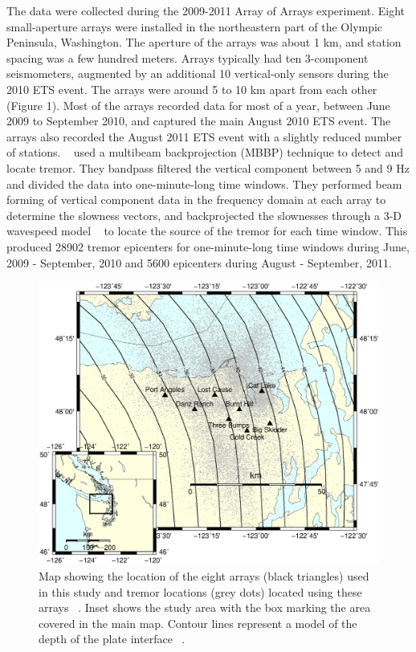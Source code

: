 \documentclass[draft]{agujournal2019}
\begin{document}
The data were collected during the 2009-2011 Array of Arrays experiment. Eight small-aperture arrays were installed in the northeastern part of the Olympic Peninsula, Washington. The aperture of the arrays was about 1 km, and station spacing was a few hundred meters. Arrays typically had ten 3-component seismometers, augmented by an additional 10 vertical-only sensors during the 2010 ETS event.  The arrays were around 5 to 10 km apart from each other (Figure 1). Most of the arrays recorded data  for most of  a year, between June 2009 to September 2010, and captured the main August 2010 ETS event. The arrays also recorded the August 2011 ETS event with a slightly reduced number of stations. ~ used a multibeam backprojection (MBBP) technique to detect and locate tremor. They bandpass filtered the vertical component between 5 and 9 Hz and divided the data into one-minute-long time windows. They performed beam forming of vertical component data in the frequency domain at each array to determine the slowness vectors, and backprojected the slownesses through a 3-D wavespeed model ~\cite{PRE_2003} to locate the source of the tremor for each time window. This produced 28902 tremor epicenters for one-minute-long time windows during June, 2009 - September, 2010 and 5600 epicenters during August - September, 2011.

\begin{figure}
\noindent\includegraphics[width=\textwidth, trim={0cm 2.5cm 0cm 9.5cm},clip]{figures/arrays_location.eps}
\caption{Map showing the location of the eight arrays (black triangles) used in this study and tremor locations (grey dots) located using these arrays ~\cite{GHO_2012}. Inset shows the study area with the box marking the area covered in the main map. Contour lines represent a model of the depth of the plate interface ~\cite{MCC_2006}.}
\label{pngfiguresample}
\end{figure}
\end{document}
